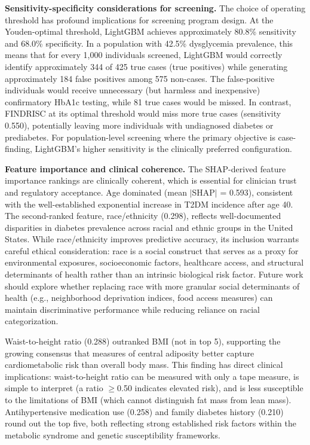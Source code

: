 \documentclass{amia}
\begin{document}
\textbf{Sensitivity-specificity considerations for screening.} The choice of operating threshold has profound implications for screening program design. At the Youden-optimal threshold, LightGBM achieves approximately 80.8\% sensitivity and 68.0\% specificity. In a population with 42.5\% dysglycemia prevalence, this means that for every 1,000 individuals screened, LightGBM would correctly identify approximately 344 of 425 true cases (true positives) while generating approximately 184 false positives among 575 non-cases. The false-positive individuals would receive unnecessary (but harmless and inexpensive) confirmatory HbA1c testing, while 81 true cases would be missed. In contrast, FINDRISC at its optimal threshold would miss more true cases (sensitivity 0.550), potentially leaving more individuals with undiagnosed diabetes or prediabetes. For population-level screening where the primary objective is case-finding, LightGBM's higher sensitivity is the clinically preferred configuration.

\textbf{Feature importance and clinical coherence.} The SHAP-derived feature importance rankings are clinically coherent, which is essential for clinician trust and regulatory acceptance. Age dominated (mean $|$SHAP$|$ = 0.593), consistent with the well-established exponential increase in T2DM incidence after age 40.\cite{apa2024} The second-ranked feature, race/ethnicity (0.298), reflects well-documented disparities in diabetes prevalence across racial and ethnic groups in the United States.\cite{vyas2020} While race/ethnicity improves predictive accuracy, its inclusion warrants careful ethical consideration: race is a social construct that serves as a proxy for environmental exposures, socioeconomic factors, healthcare access, and structural determinants of health rather than an intrinsic biological risk factor. Future work should explore whether replacing race with more granular social determinants of health (e.g., neighborhood deprivation indices, food access measures) can maintain discriminative performance while reducing reliance on racial categorization.

Waist-to-height ratio (0.288) outranked BMI (not in top 5), supporting the growing consensus that measures of central adiposity better capture cardiometabolic risk than overall body mass.\cite{browning2010} This finding has direct clinical implications: waist-to-height ratio can be measured with only a tape measure, is simple to interpret (a ratio $\geq$0.50 indicates elevated risk), and is less susceptible to the limitations of BMI (which cannot distinguish fat mass from lean mass). Antihypertensive medication use (0.258) and family diabetes history (0.210) round out the top five, both reflecting strong established risk factors within the metabolic syndrome and genetic susceptibility frameworks.
\end{document}
